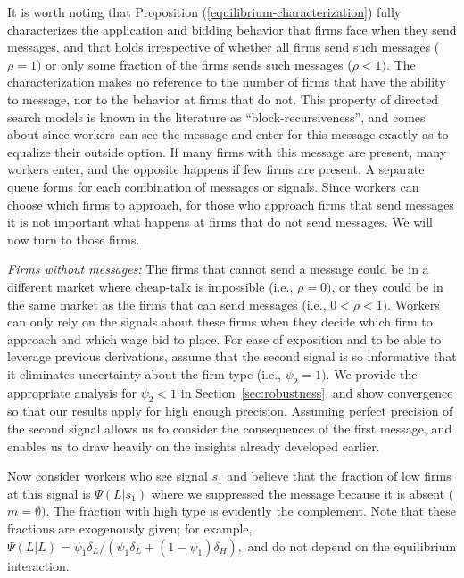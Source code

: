 \documentclass[12pt]{article}
\begin{document}
\bigskip

It is worth noting that Proposition (\ref{equilibrium-characterization})
fully characterizes the application and bidding behavior that firms face
when they send messages, and that holds irrespective of whether all firms
send such messages ($\rho =1)$ or only some fraction of the firms sends such
messages ($\rho <1).$ The characterization makes no reference to the number
of firms that have the ability to message, nor to the behavior at firms that
do not. This property of directed search models is known in the
literature as ``block-recursiveness'', and comes about since workers can see the message and enter for this message exactly as to equalize their outside option. If many firms with this message are present, many workers enter, and the opposite happens if few firms are present. A separate queue forms for each combination of messages or signals. Since workers can choose which firms to approach, for those who
approach firms that send messages it is not important what happens at firms
that do not send messages. We will now turn to those firms.

\bigskip

\textit{Firms without messages:} The firms that cannot send a message could
be in a different market where cheap-talk is impossible (i.e., $\rho =0)$,
or they could be in the same market as the firms that can send messages
(i.e., $0<\rho <1).$ Workers can only rely on the signals about these firms
when they decide which firm to approach and which wage bid to place. For
ease of exposition and to be able to leverage previous derivations, assume
that the second signal is so informative that it eliminates uncertainty about
the firm type (i.e., $\psi _{2}=1)$. We provide the appropriate analysis for $\psi _{2}<1$ in Section~\ref{sec:robustness}, and show convergence so that our results apply for high enough precision. Assuming perfect precision
of the second signal allows us to consider the consequences of the first
message, and enables us to draw heavily on the insights already developed
earlier.

Now consider workers who see signal $s_{1}$ and believe that the fraction of
low firms at this signal is $\Psi (L|s_{1})$ where we suppressed the message
because it is absent ($m=\emptyset ).$ The fraction with high type is
evidently the complement. Note that these fractions are exogenously given;
for example, $\Psi (L|L)=\psi _{1}\delta _{L}/(\psi _{1}\delta _{L}+(1-\psi
_{1})\delta _{H}),$ and do not depend on the equilibrium interaction.
\end{document}
